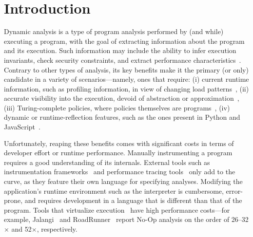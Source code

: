 \documentclass[letterpaper,twocolumn,10pt]{article}
\begin{document}
\section{Introduction}
\label{intro}

Dynamic analysis is a type of program analysis performed by (and while) executing a program, with the goal of extracting information about the program and its execution.
Such information may include the ability to infer execution invariants, check security constraints, and extract performance characteristics~\cite{analysis:10}.
Contrary to other types of analysis, its key benefits make it the primary (or only) candidate in a variety of scenarios---namely, ones that require:
  (i) current runtime information, such as profiling information, in view of changing load patterns~\cite{staticdynamic},
  (ii) accurate visibility into the execution, devoid of abstraction or approximation~\cite{staticdynamic},
  (iii) Turing-complete policies, where policies themselves are programs~\cite{contracts1, contracts2, contracts3},
  (iv) dynamic or runtime-reflection features, such as the ones present in Python and JavaScript~\cite{jsanalysis1, jsanalysis2}.


Unfortunately, reaping these benefits comes with significant costs in terms of developer effort or runtime performance.
Manually instrumenting a program requires a good understanding of its internals. %
External tools such as instrumentation frameworks~\cite{pin, valgrind} and performance tracing tools~\cite{perf, dtrace} only add to the curve, as they feature their own language for specifying analyses. %
Modifying the application's runtime environment such as the interpreter is cumbersome, error-prone, and requires development in a language that is different than that of the program.
Tools that virtualize execution~\cite{pin, valgrind, jalangi, roadrunner} have high performance costs---for example, Jalangi~\cite{jalangi} and RoadRunner~\cite{roadrunner} report No-Op analysis on the order of 26--32$\times$ and 52$\times$, respectively.
\end{document}
